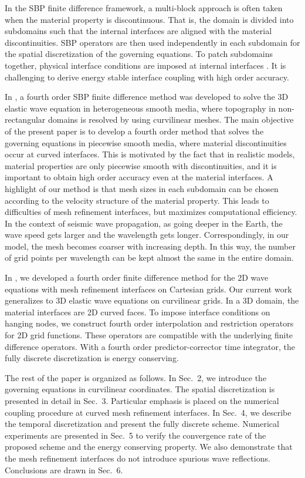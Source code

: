 In the SBP finite difference framework, a multi-block approach is often taken when the material property is discontinuous. That is, the domain is divided into subdomains such that the internal interfaces are aligned with the material discontinuities. SBP operators are then used independently in each subdomain for the spatial discretization of the governing equations. To patch subdomains together, physical interface conditions are imposed at internal interfaces \cite{Almquist2019,duru2014stable}. It is challenging to derive energy stable interface coupling with high order accuracy. 

In \cite{petersson2015wave}, a fourth order SBP finite difference method was developed to solve the 3D elastic wave equation in heterogeneous smooth media, where topography in non-rectangular domains is resolved by using curvilinear meshes. The main objective of the present paper is to develop a fourth order method that solves the governing equations in piecewise smooth media, where material discontinuities occur at curved interfaces.   This is motivated by the fact that in realistic models, material properties are only piecewise smooth with discontinuities, and it is important to obtain high order accuracy even at the material interfaces. A highlight of our method is that mesh sizes in each subdomain can be chosen according to the velocity structure of the material property. This leads to difficulties of mesh refinement interfaces, but maximizes computational efficiency. In the context of seismic wave propagation, as going deeper in the Earth, the wave speed gets larger and the wavelength gets longer. Correspondingly, in our model, the mesh becomes coarser with increasing depth. In this way, the number of grid points per wavelength can be kept almost the same in the entire domain. 

In \cite{wang2018fourth}, we developed a fourth order finite difference method for the 2D wave equations with mesh refinement interfaces on Cartesian grids. Our current work generalizes to 3D elastic wave equations on curvilinear grids. In a 3D domain, the material interfaces are 2D curved faces. To impose interface conditions on hanging nodes, we construct fourth order interpolation and restriction operators for 2D grid functions. These operators are compatible with the underlying finite difference operators. With a fourth order predictor-corrector time integrator, the fully discrete discretization is energy conserving. 

The rest of the paper is organized as follows. In Sec.~2, we introduce the governing equations in curvilinear coordinates. The spatial discretization is presented in detail in Sec.~3. Particular emphasis is placed on the numerical coupling procedure at curved mesh refinement interfaces. In Sec.~4, we describe the temporal discretization and present the fully discrete scheme. Numerical experiments are presented in Sec.~5 to verify the convergence rate of the proposed scheme and the energy conserving property. We also demonstrate that the mesh refinement interfaces do not introduce spurious wave reflections. Conclusions are drawn in Sec.~6. 
